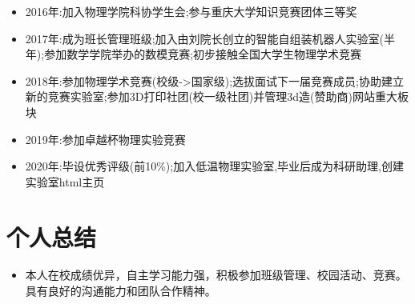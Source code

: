 \documentclass{resume}
\begin{document}
\begin{itemize}
  \item 2016年:加入物理学院科协学生会;参与重庆大学知识竞赛团体三等奖
  \item 2017年:成为班长管理班级;加入由刘院长创立的智能自组装机器人实验室(半年);参加数学学院举办的数模竞赛;初步接触全国大学生物理学术竞赛
  \item 2018年:参加物理学术竞赛(校级->国家级);选拔面试下一届竞赛成员;协助建立新的竞赛实验室;参加3D打印社团(校一级社团)并管理3d造(赞助商)网站重大板块
  \item 2019年:参加卓越杯物理实验竞赛
  \item 2020年:毕设优秀评级(前10\%);加入低温物理实验室,毕业后成为科研助理,创建实验室html主页
\end{itemize}


\section{个人总结}

\begin{itemize}
  \item 本人在校成绩优异，自主学习能力强，积极参加班级管理、校园活动、竞赛。具有良好的沟通能力和团队合作精神。
\end{itemize}
\end{document}
